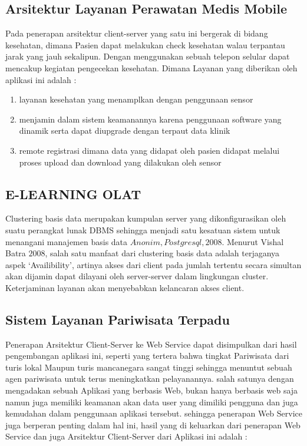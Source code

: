 \subsection{Arsitektur Layanan Perawatan Medis Mobile}
Pada penerapan arsitektur client-server yang satu ini bergerak di bidang kesehatan, dimana Pasien dapat melakukan check kesehatan
walau terpantau jarak yang jauh sekalipun. Dengan menggunakan sebuah telepon selular dapat mencakup kegiatan pengecekan kesehatan.
Dimana Layanan yang diberikan oleh aplikasi ini adalah :
\begin{enumerate}
    \item layanan kesehatan yang menamplkan dengan penggunaan sensor
    \item menjamin dalam sistem keamanannya karena penggunaan software yang dinamik serta dapat diupgrade dengan terpaut data klinik
    \item remote registrasi dimana data yang didapat oleh pasien didapat melalui proses upload dan download yang dilakukan oleh sensor
\end{enumerate}

\subsection {E-LEARNING OLAT} 
Clustering basis data merupakan kumpulan server yang dikonfigurasikan oleh suatu perangkat lunak DBMS sehingga menjadi satu kesatuan sistem 
untuk menangani manajemen basis data \(Anonim, Postgresql, 2008\). Menurut Vishal Batra \(2008\), salah satu manfaat dari clustering basis data 
adalah terjaganya aspek `Availibility', artinya akses dari client pada jumlah tertentu secara simultan akan dijamin dapat dilayani oleh 
server-server dalam lingkungan cluster. Keterjaminan layanan akan menyebabkan kelancaran akses client.

\subsection {Sistem Layanan Pariwisata Terpadu}
Penerapan Arsitektur Client-Server ke Web Service dapat disimpulkan dari hasil pengembangan aplikasi ini, seperti yang tertera bahwa tingkat Pariwisata
dari turis lokal Maupun turis mancanegara sangat tinggi sehingga menuntut sebuah agen pariwisata untuk terus meningkatkan pelayanannya. salah satunya dengan
mengadakan sebuah Aplikasi yang berbasis Web, bukan hanya berbasis web saja namun juga memiliki keamanan akan data user yang dimiliki pengguna dan juga kemudahan
dalam penggunaan aplikasi tersebut. sehingga penerapan Web Service juga berperan penting dalam hal ini, hasil yang di keluarkan dari penerapan Web Service dan juga
Arsitektur Client-Server dari Aplikasi ini adalah :


